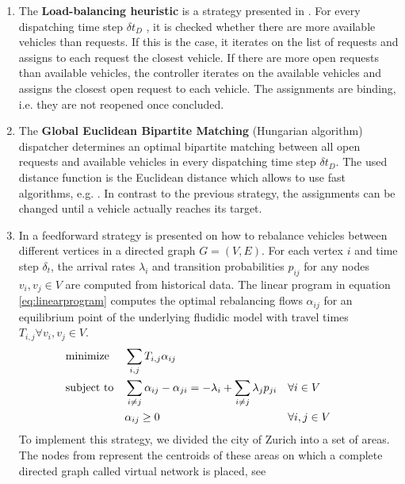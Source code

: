 \begin{enumerate}
\item The \textbf{Load-balancing heuristic} is a strategy presented in \cite{bischoff2016simulation}.
For every dispatching time step $\delta t_D$ , it is checked whether there are more available vehicles than requests.
If this is the case, it iterates on the list of requests and assigns to each request the closest vehicle. If there are more open
requests than available vehicles, the controller iterates on the available vehicles and assigns the closest open request to each vehicle.
The assignments are binding, i.e. they are not reopened once concluded.
\item The \textbf{Global Euclidean Bipartite Matching} (Hungarian algorithm) dispatcher determines an optimal bipartite
matching between all open requests and available vehicles in every dispatching time step
$\delta t_D$. The used distance function is the Euclidean distance which allows to use fast
algorithms, e.g. \cite{agarwal2004near}. In contrast to the previous strategy, the
assignments can be changed until a vehicle actually reaches its target.
\item In \cite{pavone2011load} a feedforward strategy is presented on how to rebalance vehicles between different vertices
in a directed graph $G = (V,E)$. For each vertex $i$ and time step $\delta_t$, the arrival rates $\lambda_i$ and transition probabilities $p_{ij}$ for
any nodes $v_i, v_j \in V$  are computed from historical data. The linear program in equation \ref{eq:linearprogram}
computes the optimal rebalancing flows $\alpha _{ij}$ for an equilibrium point of the underlying fludidic
model with travel times $T_{i,j} \forall v_i, v_j \in V$.
\begin{align}
&\textnormal{minimize}& &\sum_{i,j} T_{i,j} \alpha _{ij} & && && \nonumber \\
&\textnormal{subject to}&
&\sum_{i \neq j} \alpha _{ij} - \alpha _{ji} =-\lambda_i  + \sum_{i \neq j} \lambda_j p_{ji}
& &\forall i \in V &\label{eq:linearprogram} \\
&& &\alpha_{ij} \geq 0& & \forall i, j \in V& \nonumber
\end{align}
To implement this strategy, we divided the city of Zurich into a set of areas.
The nodes from \cite{pavone2011load} represent the centroids of these areas on
which a complete directed graph called virtual network is placed, see

\end{enumerate}
